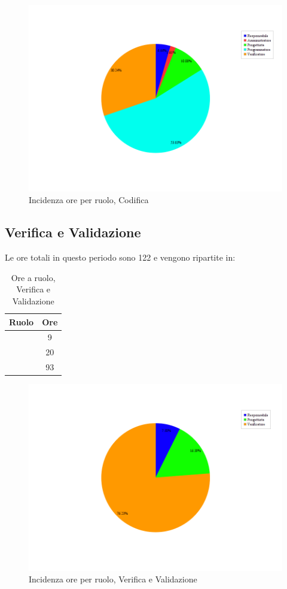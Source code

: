 \begin{figure}[H]
	\centering
	\includegraphics[scale=0.5]{immagini/Grafi/OreRuoloCod}
	\caption{Incidenza ore per ruolo, Codifica}
\end{figure}

\subsection{Verifica e Validazione}
Le ore totali in questo periodo sono 122 e vengono ripartite in:
\begin{table}[H]
	\begin{center}
		\begin{tabular}{|c|c|}
			\hline
			\textbf{Ruolo}	& \textbf{Ore} \\
			\hline
			\Res	&	9	\\
			\hline
			\Prog		&	20	\\
			\hline
			\Ver	&	93	\\
			\hline
		\end{tabular}
	\end{center}
	\caption{Ore a ruolo, Verifica e Validazione}
\end{table}

\begin{figure}[H]
	\centering
	\includegraphics[scale=0.5]{immagini/Grafi/OreRuoloVerifica}
	\caption{Incidenza ore per ruolo, Verifica e Validazione}
\end{figure}

